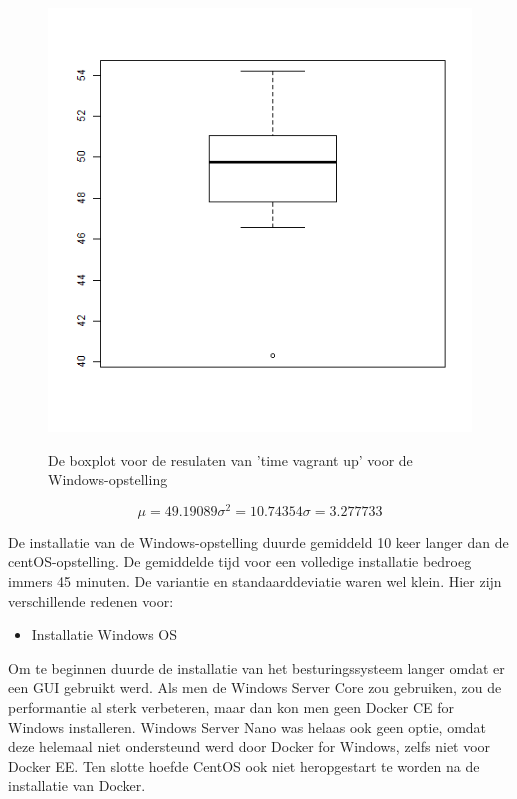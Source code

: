 \begin{figure}
	\centering
	\caption{De boxplot voor de resulaten van 'time vagrant up' voor de Windows-opstelling}
	\includegraphics[scale=0.5]{img/windowsboxplotfull.png}
	\label{fig:windowsupboxplot}
\end{figure}

\[\mu = 49.19089 \sigma^2 = 10.74354 \sigma = 3.277733\]

De installatie van de Windows-opstelling duurde gemiddeld 10 keer langer dan de centOS-opstelling. De gemiddelde tijd voor een volledige installatie bedroeg immers 45 minuten. De variantie en standaarddeviatie waren wel klein. Hier zijn verschillende redenen voor:

\begin{itemize}[noitemsep]
	\item Installatie Windows OS
\end{itemize}

Om te beginnen duurde de installatie van het besturingssysteem langer omdat er een GUI gebruikt werd. Als men de Windows Server Core zou gebruiken, zou de performantie al sterk verbeteren, maar dan kon men geen Docker CE for Windows installeren. Windows Server Nano was helaas ook geen optie, omdat deze helemaal niet ondersteund werd door Docker for Windows, zelfs niet voor Docker EE. Ten slotte hoefde CentOS ook niet heropgestart te worden na de installatie van Docker. \autocite{xlegalles2017}

